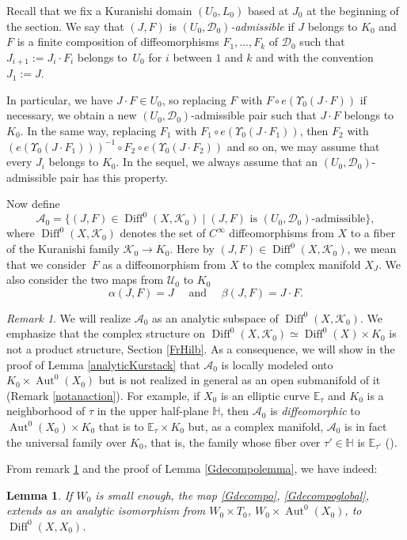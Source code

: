 \documentclass[JEP,XML,SOM,Unicode]{cedram}
\let\mathcal\mathscr
\DeclareMathOperator{\Aut}{Aut}
\DeclareMathOperator{\Diff}{Diff}
\theoremstyle{plain}
\newtheorem{lemma}[theorem]{Lemma}
\theoremstyle{definition}
\theoremstyle{remark}
\newtheorem{remark}[theorem]{Remark}
\numberwithin{equation}{section}
\newcommand{\Azero}{\Aut^0(X_0)}
\newcommand{\D}{\Diff^0(X)}
\begin{document}
Recall that we fix a Kuranishi domain $(U_0,L_0)$ based at $J_0$ at the beginning of the section. We say that $(J,F)$ is \emph{$(U_0,\mathcal D_0)$-admissible} if $J$ belongs to $K_0$ and $F$ is a finite composition of diffeomorphisms $F_1,\hdots, F_k$ of $\mathcal D_0$ such that $J_{i+1}:=J_i\cdot F_i$ belongs to~$U_0$ for $i$ between $1$ and $k$ and with the convention $J_1:=J$.

In particular, we have $J\cdot F\in U_0$, so replacing $F$ with $F\circ e(\Upsilon_0(J\cdot F))$ if necessary, we obtain a new $(U_0,\mathcal D_0)$-admissible pair such that $J\cdot F$ belongs to $K_0$. In the same way, replacing $F_1$ with $F_1\circ e(\Upsilon_0(J\cdot F_1))$, then $F_2$ with $(e(\Upsilon_0(J\cdot F_1)))^{-1}\circ F_2\circ e(\Upsilon_0(J\cdot F_2))$ and so on, we may assume that every $J_i$ belongs to $K_0$. In the sequel, we always assume that an $(U_0,\mathcal D_0)$-admissible pair has this property.

Now define
\begin{equation}
\label{Azero}
\mathcal A_0=\{(J,F)\in \Diff^0 (X,\mathcal K_0)\mid (J,F)\text{ is }(U_0,\mathcal D_0)\text{-admissible}\},
\end{equation}
where $\Diff^0 (X,\mathcal K_0)$ denotes the set of $C^\infty$ diffeomorphisms from $X$ to a fiber of the Kuranishi family $\mathcal K_0\to K_0$. Here by $(J,F)\in \Diff^0 (X,\mathcal K_0)$, we mean that we consider~$F$ as a diffeomorphism from $X$ to the complex manifold $X_J$. We also consider the two maps from $\mathcal U_0$ to $K_0$
\begin{equation}
\label{st}
\alpha (J,F)=J\quad\text{ and }\quad \beta (J,F)=J\cdot F.
\end{equation}
\begin{remark}
\label{important}
We will realize $\mathcal A_0$ as an analytic subspace of $\Diff^0 (X,\mathcal K_0)$. We emphasize that the complex structure on $\Diff^0(X,\mathcal K_0)\simeq \D\times K_0$ is not a product structure, \cf Section \ref{FrHilb}. As a consequence, we will show in the proof of Lemma \ref{analyticKurstack} that $\mathcal A_0$ is locally modeled onto $K_0\times\Azero$ but is not realized in general as an open submanifold of it (\cf Remark \ref{notanaction}).
For example, if $X_0$ is an elliptic curve $\mathbb E_\tau$ and $K_0$ is a neighborhood of $\tau$ in the upper half-plane $\mathbb H$, then $\mathcal A_0$ is \emph{diffeomorphic} to $\Azero\times K_0$ that is to $\mathbb E_\tau\times K_0$ but, as a complex manifold, $\mathcal A_0$ is in fact the universal family over $K_0$, that is, the family whose fiber over $\tau'\in\mathbb H$ is $\mathbb E_{\tau'}$ (\cf \cite{Namba}).
\end{remark}
From remark \ref{important} and the proof of Lemma \ref{Gdecompolemma}, we have indeed:
\begin{lemma}
\label{Gdecompolemmaanalytic}
If $W_0$ is small enough, the map \eqref{Gdecompo}, \resp \eqref{Gdecompoglobal}, extends as an analytic isomorphism from $W_0\times T_0$, \resp $W_0\times \Azero$, to $\Diff^0 (X,X_0)$.
\end{lemma}
\end{document}
